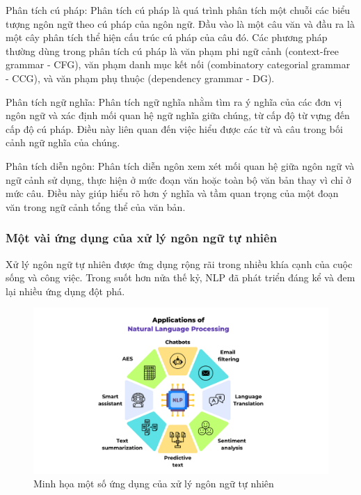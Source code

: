 Phân tích cú pháp: Phân tích cú pháp là quá trình phân tích một chuỗi các biểu tượng ngôn ngữ theo cú pháp của ngôn ngữ. Đầu vào là một câu văn và đầu ra là một cây phân tích thể hiện cấu trúc cú pháp của câu đó. Các phương pháp thường dùng trong phân tích cú pháp là văn phạm phi ngữ cảnh (context-free grammar - CFG), văn phạm danh mục kết nối (combinatory categorial grammar - CCG), và văn phạm phụ thuộc (dependency grammar - DG). 

Phân tích ngữ nghĩa: Phân tích ngữ nghĩa nhằm tìm ra ý nghĩa của các đơn vị ngôn ngữ và xác định mối quan hệ ngữ nghĩa giữa chúng, từ cấp độ từ vựng đến cấp độ cú pháp. Điều này liên quan đến việc hiểu được các từ và câu trong bối cảnh ngữ nghĩa của chúng.
 
Phân tích diễn ngôn: Phân tích diễn ngôn xem xét mối quan hệ giữa ngôn ngữ và ngữ cảnh sử dụng, thực hiện ở mức đoạn văn hoặc toàn bộ văn bản thay vì chỉ ở mức câu. Điều này giúp hiểu rõ hơn ý nghĩa và tầm quan trọng của một đoạn văn trong ngữ cảnh tổng thể của văn bản. 

\subsubsection{Một vài ứng dụng của xử lý ngôn ngữ tự nhiên}

Xử lý ngôn ngữ tự nhiên được ứng dụng rộng rãi trong nhiều khía cạnh của cuộc sống và công việc. Trong suốt hơn nửa thế kỷ, NLP đã phát triển đáng kể và đem lại nhiều ứng dụng đột phá. 

\begin{figure}[htb]
    \centering
    \includegraphics[width=\textwidth]{image/applications-of-nlp.png}
    \caption{Minh họa một số ứng dụng của xử lý ngôn ngữ tự nhiên}
    \label{fig:applications-of-nlp}
\end{figure}


